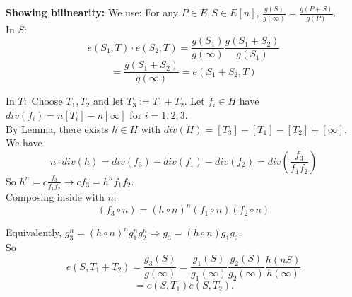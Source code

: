 \documentclass[shadesubsections,compress,14pt,mathserif]{beamer}
\newcommand{\defeq}{\ensuremath{:=}}
\newcommand{\nl}{\\ \pause \vspace{0.2in}}
\begin{document}
\begin{frame}
 \textbf{Showing bilinearity:}
We use: For any $P\in E, S\in E[n]$, $\frac{g(S)}{g(\infty)}=\frac{g(P+S)}{g(P)}$. \nl
In $S:$
$$ e(S_1,T)\cdot e(S_2,T) = \frac{g(S_1)}{g(\infty)}\frac{g(S_1+S_2)}{g(S_1)}$$\pause
$$= \frac{g(S_1+S_2)}{g(\infty)}= e(S_1+S_2,T)$$\pause

\end{frame}
\begin{frame}
 In $T:$
 Choose $T_1,T_2$ and let $T_3\defeq T_1+T_2$. Let $f_i\in H$ have $div(f_i) = n[T_i]-n[\infty]$
 for $i=1,2,3$.\nl
 By Lemma, there exists $h\in H$ with $div(H)=[T_3]-[T_1]-[T_2]+[\infty]$.\nl
 We have
 $$n\cdot div(h) = div(f_3)-div(f_1)-div(f_2) = div\left(\frac{f_3}{f_1 f_2}\right)$$\pause
 So $h^n = c \frac{f_3}{f_1 f_2} \rightarrow c f_3=h^n f_1 f_2$.\nl
 Composing inside with $n$:
 $$(f_3\circ n) = (h\circ n )^n (f_1\circ n) (f_2 \circ n)$$\pause
 
\end{frame}
\begin{frame}
 Equivalently, $g_3^n = (h\circ n)^n g_1 ^n g_2^n \Rightarrow g_3 = (h \circ n) g_1 g_2$.\nl
 So 
 $$e(S,T_1+T_2) = \frac{g_3(S)}{g(\infty)}= \frac{g_1(S)}{g_1(\infty)}\frac{g_2(S)}{g_2(\infty)}\frac{h(nS)}{h(\infty)}$$\pause
 $$=e(S,T_1)e(S,T_2).$$
\end{frame}
\end{document}
